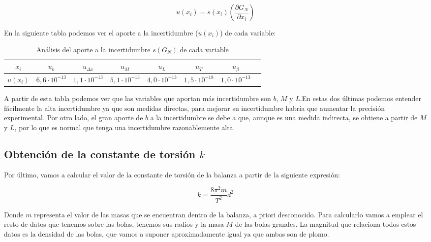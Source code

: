 \documentclass[a4paper,12pt,titlepage]{article}
\begin{document}
\begin{equation}
    u(x_i) = s(x_i)\left(\frac{\partial G_N}{\partial x_i}\right)
\end{equation}

\newpage

En la siguiente tabla podemos ver el aporte a la incertidumbre ($u(x_i)$) de cada variable:

\begin{table}[h!]
    \centering
    \begin{tabular}{|c|c|c|c|c|c|c|c|}
        \hline
        $x_i$ & $u_b$ & $u_{\Delta x}$ & $u_M$ & $u_L$ & $u_T$ & $u_{\beta}$   \\ \hline
        $u(x_i)$ & $6,6\cdot 10^{-13}$ & $1,1\cdot 10^{-13}$ & $5,1 \cdot 10^{-13}$ &
        $4,0\cdot10^{-13}$ & $1,5\cdot 10^{-18}$ & $1,0\cdot 10^{-13}$ \\ \hline
    \end{tabular}
    \caption{Análisis del aporte a la incertidumbre $s(G_N)$ de cada variable}
\end{table}

A partir de esta tabla podemos ver que las variables que aportan más incertidumbre son $b$, $M$ y $L$.En estas dos últimas podemos entender fácilmente la alta incertidumbre ya que son medidas directas, para mejorar su incertidumbre habría que aumentar la precisión experimental. Por otro lado, el gran aporte de $b$ a la incertidumbre se debe a que, aunque es una medida indirecta, se obtiene a partir de $M$ y $L$, por lo que es normal que tenga una incertidumbre razonablemente alta.

\subsection{Obtención de la constante de torsión $k$}

Por último, vamos a calcular el valor de la constante de torsión de la balanza a partir de la siguiente expresión:

\begin{equation}
    k = \frac{8\pi^2m}{T^2}d^2
    \label{k}
\end{equation}

Donde $m$ representa el valor de las masas que se encuentran dentro de la balanza, a priori desconocido. Para calcularlo vamos a emplear el resto de datos que tenemos sobre las bolas, tenemos sus radios y la masa $M$ de las bolas grandes. La magnitud que relaciona todos estos datos es la densidad de las bolas, que vamos a suponer aproximadamente igual ya que ambas son de plomo.
\end{document}
